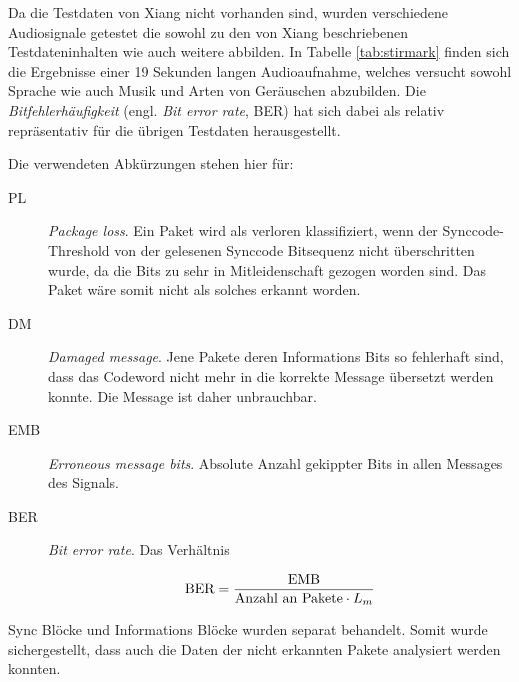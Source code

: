 Da die Testdaten von Xiang nicht vorhanden sind, wurden verschiedene Audiosignale getestet die sowohl zu den von Xiang beschriebenen Testdateninhalten wie auch weitere abbilden. In Tabelle \ref{tab:stirmark} finden sich die Ergebnisse einer 19 Sekunden langen Audioaufnahme, welches versucht sowohl Sprache wie auch Musik und Arten von Geräuschen abzubilden. Die \textit{Bitfehlerhäufigkeit} (engl. \textit{Bit error rate},  BER) hat sich dabei als relativ repräsentativ für die übrigen Testdaten herausgestellt. 

Die verwendeten Abkürzungen stehen hier für:

\begin{description}
	
\item[PL] \textit{Package loss}. Ein Paket wird als verloren klassifiziert, wenn der Synccode-Threshold von der gelesenen Synccode Bitsequenz nicht überschritten wurde, da die Bits zu sehr in Mitleidenschaft gezogen worden sind. Das Paket wäre somit nicht als solches erkannt worden. 

\item[DM] \textit{Damaged message}. Jene Pakete deren Informations Bits so fehlerhaft sind, dass das Codeword nicht mehr in die korrekte Message übersetzt werden konnte. Die Message ist daher unbrauchbar.

\item[EMB] \textit{Erroneous message bits}. Absolute Anzahl gekippter Bits in allen Messages des Signals. 

\item[BER] \textit{Bit error rate}. Das Verhältnis 

	\begin{equation}
		\mbox{BER} = {\mbox{EMB} \over \mbox{Anzahl an Pakete} \cdot {L}_{m}}
		\label{equ:ber}
	\end{equation}
\end{description}

Sync Blöcke  und Informations Blöcke wurden separat behandelt. Somit wurde sichergestellt, dass auch die Daten der nicht erkannten Pakete analysiert werden konnten.  

